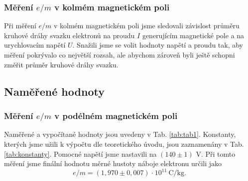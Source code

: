 \documentclass[english]{article}
\begin{document}
		\subsubsection{Měření $e/m$ v kolmém magnetickém poli}
			Při měření $e/m$ v kolmém magnetickém poli jsme sledovali závislost průměru kruhové dráhy svazku elektronů na proudu $I$ generujícím magnetické pole a na urychlovacím napětí $U$. Snažili jsme se volit hodnoty napětí a proudu tak, aby měření pokrývalo co největší rozsah, ale abychom zároveň byli ještě schopni změřit průměr kruhové dráhy svazku. 
			
	\subsection{Naměřené hodnoty}
		\subsubsection{Měření $e/m$ v podélném magnetickém poli}
			Naměřené a vypočítané hodnoty jsou uvedeny v Tab. \ref{tab:tab1}. Konstanty, kterých jsme užili k výpočtu dle teoretického úvodu, jsou zaznamenány v Tab. \ref{tab:konstanty}. Pomocné napětí jsme nastavili na $(140\pm1)$ V. Při tomto měření jsme finální hodnotu měrné hustoty náboje elektronu určili jako 
			\begin{equation}
				e/m = (1,970\pm0,007)~\mathrm{\cdot~10^{11}~C/kg}.
			\end{equation}
\end{document}
